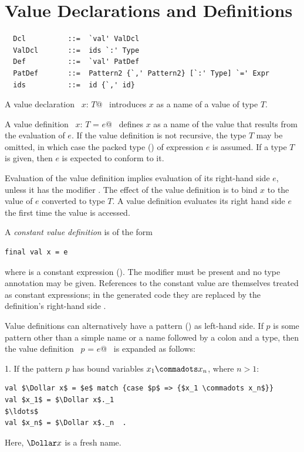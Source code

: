 \section{Value Declarations and Definitions}
\label{sec:valdef}

\syntax\begin{lstlisting}
  Dcl          ::=  `val' ValDcl
  ValDcl       ::=  ids `:' Type
  Def          ::=  `val' PatDef 
  PatDef       ::=  Pattern2 {`,' Pattern2} [`:' Type] `=' Expr
  ids          ::=  id {`,' id}
\end{lstlisting}

A value declaration ~\lstinline@val $x$: $T$@~ introduces $x$ as a name of a value of
type $T$.  

A value definition ~\lstinline@val $x$: $T$ = $e$@~ defines $x$ as a
name of the value that results from the evaluation of $e$. 
If the value definition is not recursive, the type
$T$ may be omitted, in which case the packed type () of expression $e$ is
assumed.  If a type $T$ is given, then $e$ is expected to conform to
it.

Evaluation of the value definition implies evaluation of its
right-hand side $e$, unless it has the modifier \lstinline@lazy@.  The
effect of the value definition is to bind $x$ to the value of $e$
converted to type $T$. A \lstinline@lazy@ value definition evaluates
its right hand side $e$ the first time the value is accessed.

A {\em constant value definition} is of the form
\begin{lstlisting}
final val x = e
\end{lstlisting}
where \lstinline@e@ is a constant expression
(). 
The \lstinline@final@ modifier must be
present and no type annotation may be given. References to the
constant value \lstinline@x@ are themselves treated as constant expressions; in the
generated code they are replaced by the definition's right-hand side \lstinline@e@.

Value definitions can alternatively have a pattern
() as left-hand side.  If $p$ is some pattern other
than a simple name or a name followed by a colon and a type, then the
value definition ~\lstinline@val $p$ = $e$@~ is expanded as follows:

1. If the pattern $p$ has bound variables $x_1 \commadots x_n$, where $n > 1$:
\begin{lstlisting}
val $\Dollar x$ = $e$ match {case $p$ => {$x_1 \commadots x_n$}}
val $x_1$ = $\Dollar x$._1
$\ldots$
val $x_n$ = $\Dollar x$._n  .
\end{lstlisting}
Here, $\Dollar x$ is a fresh name.  

